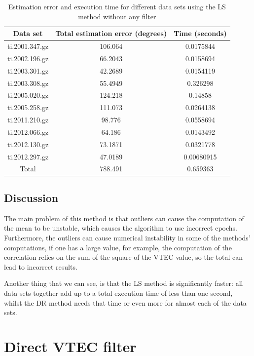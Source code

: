 \begin{table}[h!]
	\centering
	\def\arraystretch{1.2}
	\begin{tabular}{|c c c|} 
		\hline
		Data set & Total estimation error (degrees) & Time (seconds) \\ [0.5ex] 
		\hline\hline
		ti.2001.347.gz & 106.064 & 0.0175844 \\
		\hline
		ti.2002.196.gz & 66.2043 & 0.0158694 \\
		\hline
		ti.2003.301.gz & 42.2689 & 0.0154119 \\
		\hline
		ti.2003.308.gz & 55.4949 & 0.326298 \\
		\hline
		ti.2005.020.gz & 124.218 & 0.14858 \\
		\hline
		ti.2005.258.gz & 111.073 & 0.0264138 \\
		\hline
		ti.2011.210.gz & 98.776 & 0.0558694 \\
		\hline
		ti.2012.066.gz & 64.186 & 0.0143492 \\
		\hline
		ti.2012.130.gz & 73.1871 & 0.0321778 \\
		\hline
		ti.2012.297.gz & 47.0189 & 0.00680915 \\
		\hline\hline
		Total & 788.491 & 0.659363 \\
		\hline
	\end{tabular}
	\caption{Estimation error and execution time for different data sets using the LS method without any filter}
\end{table}

\subsection{Discussion}

The main problem of this method is that outliers can cause the computation of the mean to be unstable, which causes the algorithm to use incorrect epochs. Furthermore, the outliers can cause numerical instability in some of the methods' computations, if one has a large value, for example, the computation of the correlation relies on the sum of the square of the VTEC value, so the total can lead to incorrect results.

Another thing that we can see, is that the LS method is significantly faster: all data sets together add up to a total execution time of less than one second, whilst the DR method needs that time or even more for almost each of the data sets.

\section{Direct VTEC filter}

